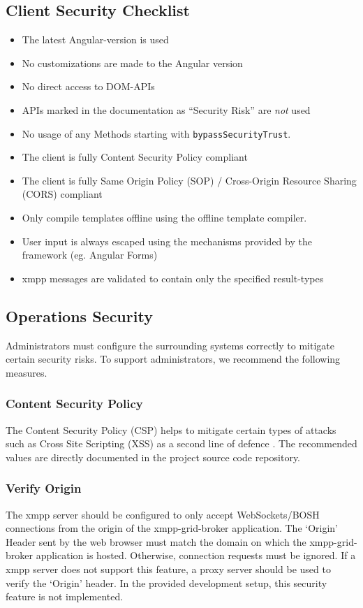 \subsection{Client Security Checklist}
\begin{itemize}
    \item The latest Angular-version is used
    \item No customizations are made to the Angular version
    \item No direct access to DOM-APIs
    \item APIs marked in the documentation as ``Security Risk'' are \emph{not} used
    \item No usage of any Methods starting with \texttt{bypassSecurityTrust}.
    \item The client is fully Content Security Policy compliant
    \item The client is fully Same Origin Policy (SOP) / Cross-Origin Resource Sharing (CORS) compliant
    \item Only compile templates offline using the offline template compiler.
    \item User input is always escaped using the mechanisms provided by the framework (eg. Angular Forms)
    \item \gls{xmpp} \glspl{message} are validated to contain only the specified result-types
\end{itemize}

\subsection{Operations Security}\label{sec:ops-security}


Administrators must configure the surrounding systems correctly to mitigate certain security risks.
To support administrators, we recommend the following measures.

\subsubsection{Content Security Policy}

The Content Security Policy (CSP) helps to mitigate certain types of attacks such as Cross Site Scripting (XSS) as a second line of defence \cite{w3c-csp}.
The recommended values are directly documented in the project source code repository.

\subsubsection{Verify Origin}
The \gls{xmpp} server should be configured to only accept WebSockets/BOSH connections from the origin of the \gls{xmpp-grid-broker} application.
The `Origin' Header sent by the web browser must match the domain on which the \gls{xmpp-grid-broker} application is hosted.
Otherwise, connection requests must be ignored.
If a \gls{xmpp} server does not support this feature, a proxy server should be used to verify the `Origin' header.
In the provided development setup, this security feature is not implemented.
